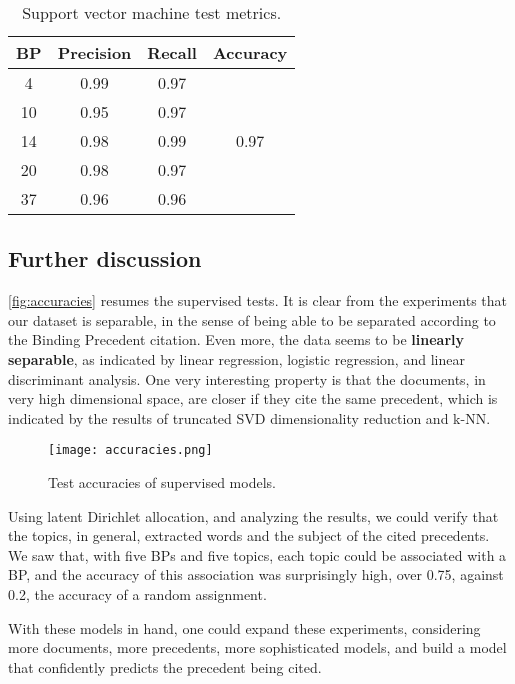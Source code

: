         \begin{table}[H]
                \centering
                \caption{Support vector machine test metrics.}
                \label{tab:svm}
                \begin{tabular}{c|cc|c}
                BP & Precision & Recall & Accuracy              \\ \hline
                4  & 0.99      & 0.97   & \multirow{5}{*}{0.97} \\
                10 & 0.95      & 0.97   &                       \\
                14 & 0.98      & 0.99   &                       \\
                20 & 0.98      & 0.97   &                       \\
                37 & 0.96      & 0.96   &                      
                \end{tabular}
        \end{table}

    \subsection{Further discussion}

        \autoref{fig:accuracies} resumes the supervised tests. It is clear from the experiments that our dataset is separable, in the sense of being able to be separated according to the Binding Precedent citation. Even more, the data seems to be \textbf{linearly separable}, as indicated by linear regression, logistic regression, and linear discriminant analysis. One very interesting property is that the documents, in very high dimensional space, are closer if they cite the same precedent, which is indicated by the results of truncated SVD dimensionality reduction and k-NN.

        \begin{figure}[H]
                \texttt{[image: accuracies.png]}
                \caption{Test accuracies of supervised models.}
                \label{fig:accuracies}
        \end{figure}

        Using latent Dirichlet allocation, and analyzing the results, we could verify that the topics, in general, extracted words and the subject of the cited precedents. We saw that, with five BPs and five topics, each topic could be associated with a BP, and the accuracy of this association was surprisingly high, over 0.75, against 0.2, the accuracy of a random assignment.

        With these models in hand, one could expand these experiments, considering more documents, more precedents, more sophisticated models, and build a model that confidently predicts the precedent being cited.

